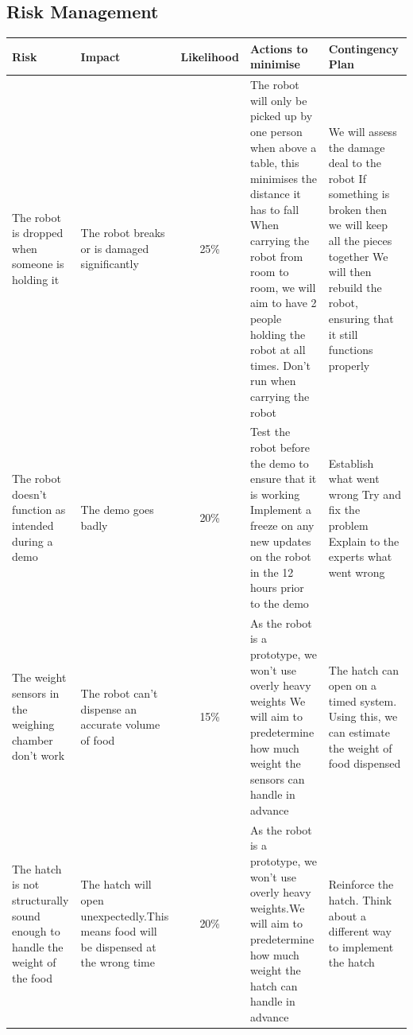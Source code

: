    \subsection{Risk Management}
    

\begin{tabular}{ ||p{3cm}|p{3cm}|c|p{4cm}|p{4cm}|| } 
 \hline \hline
 \textbf{Risk} & \textbf{Impact} & \textbf{Likelihood} & \textbf{Actions to minimise} & \textbf{Contingency Plan} \\ 
 \hline \hline
The robot is dropped when someone is holding it & 
 The robot breaks or is damaged significantly & 
 25\% & 
The robot will only be picked up by one person when above a table, this minimises the distance it has to fall
When carrying the robot from room to room, we will aim to have 2 people holding the robot at all times.
Don’t run when carrying the robot
 & 
 We will assess the damage deal to the robot
If something is broken then we will keep all the pieces together
We will then rebuild the robot, ensuring that it still functions properly
 \\ 
 \hline
 
 
The robot doesn’t function as intended during a demo & 
The demo goes badly & 
 20\% & 
Test the robot before the demo to ensure that it is working
Implement a freeze on any new updates on the robot in the 12 hours prior to the demo
 & 
Establish what went wrong
Try and fix the problem
Explain to the experts what went wrong
 \\ 
 \hline
 
 The weight sensors in the weighing chamber don’t work&
 The robot can’t dispense an accurate volume of food&
 15\%&
 
As the robot is a prototype, we won’t use overly heavy weights
We will aim to predetermine how much weight the sensors can handle in advance
&
 The hatch can open on a timed system. Using this, we can estimate the weight of food dispensed \\ \hline
 
  The hatch is not structurally sound enough to handle the weight of the food&
  The hatch will open unexpectedly.This means food will be dispensed at the wrong time&
  20\%&
  
As the robot is a prototype, we won’t use overly heavy weights.We will aim to predetermine how much weight the hatch can handle in advance &
  Reinforce the hatch.
Think about a different way to implement the hatch
 \\ \hline
  

\end{tabular}

